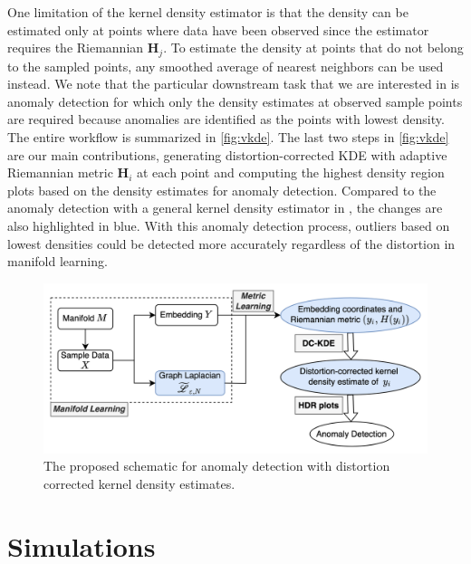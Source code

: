 \documentclass[11pt,a4paper,]{article}
\begin{document}
One limitation of the kernel density estimator is that the density can be estimated only at points where data have been observed since the estimator requires the Riemannian \(\pmb{H}_j\). To estimate the density at points that do not belong to the sampled points, any smoothed average of nearest neighbors can be used instead. We note that the particular downstream task that we are interested in is anomaly detection for which only the density estimates at observed sample points are required because anomalies are identified as the points with lowest density. The entire workflow is summarized in \autoref{fig:vkde}. The last two steps in \autoref{fig:vkde} are our main contributions, generating distortion-corrected KDE with adaptive Riemannian metric \(\pmb{H}_i\) at each point and computing the highest density region plots based on the density estimates for anomaly detection. Compared to the anomaly detection with a general kernel density estimator in \textcite{Cheng2021-ex}, the changes are also highlighted in blue. With this anomaly detection process, outliers based on lowest densities could be detected more accurately regardless of the distortion in manifold learning.



\begin{figure}

{\centering \includegraphics[width=0.95\linewidth]{figures/DC-KDE} 

}

\caption{The proposed schematic for anomaly detection with distortion corrected kernel density estimates.}\label{fig:vkde}
\end{figure}

\hypertarget{simulation}{%
\section{Simulations}\label{simulation}}
\end{document}

